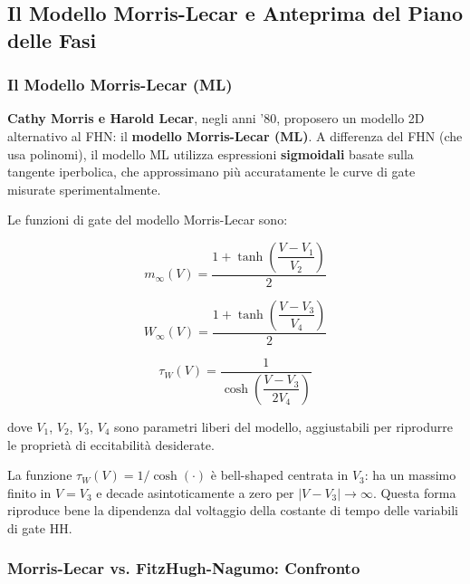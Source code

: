 \subsection{Il Modello Morris-Lecar e Anteprima del Piano delle Fasi}

\subsubsection{Il Modello Morris-Lecar (ML)}

\textbf{Cathy Morris e Harold Lecar}, negli anni '80, proposero un modello 2D alternativo al FHN: il \textbf{modello Morris-Lecar (ML)}. A differenza del FHN (che usa polinomi), il modello ML utilizza espressioni \textbf{sigmoidali} basate sulla tangente iperbolica, che approssimano più accuratamente le curve di gate misurate sperimentalmente.

Le funzioni di gate del modello Morris-Lecar sono:

\begin{equation}
m_\infty(V) = \frac{1 + \tanh\!\left(\dfrac{V - V_1}{V_2}\right)}{2}
\end{equation}

\begin{equation}
W_\infty(V) = \frac{1 + \tanh\!\left(\dfrac{V - V_3}{V_4}\right)}{2}
\end{equation}

\begin{equation}
\tau_W(V) = \frac{1}{\cosh\!\left(\dfrac{V - V_3}{2V_4}\right)}
\end{equation}

dove $V_1$, $V_2$, $V_3$, $V_4$ sono parametri liberi del modello, aggiustabili per riprodurre le proprietà di eccitabilità desiderate.

La funzione $\tau_W(V) = 1/\cosh(\cdot)$ è bell-shaped centrata in $V_3$: ha un massimo finito in $V = V_3$ e decade asintoticamente a zero per $|V - V_3| \to \infty$. Questa forma riproduce bene la dipendenza dal voltaggio della costante di tempo delle variabili di gate HH.

\subsubsection{Morris-Lecar vs. FitzHugh-Nagumo: Confronto}


